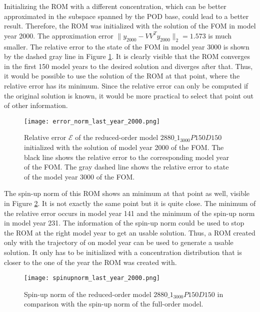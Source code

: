 Initializing the ROM with a different concentration, which can be better approximated in the subspace spanned by the POD base, could lead to a better result. Therefore, 
the ROM was initialized with the solution of the FOM in model year 2000. The approximation error $\parallel y_{2000} - VV^Ty_{2000} \parallel_2 = 1.573$ is much smaller.
The relative error to the state of the FOM in model year 3000 is shown by the dashed gray line in Figure \ref{fig:error_norm_last_year_2000}. It is clearly visible that the ROM converges in the first 150 model years to the desired solution and diverges after that. Thus, it would be possible to use the solution of the ROM at that point, where the relative error has its minimum. Since the relative error can only be computed if the original solution is known, it would be more practical to select that point out of other information. 
\begin{figure}[ht]
\centering
  \texttt{[image: error\_norm\_last\_year\_2000.png]}
  \caption[Relative error $\mathcal{E}$ of the reduced-order model $2880\_1_{3000}P150D150$ initialized with the solution of model year 2000 of the FOM.]{Relative error $\mathcal{E}$ of the reduced-order model $2880\_1_{3000}P150D150$
	    initialized with the solution of model year 2000 of the FOM. The black line shows the relative error to the corresponding model year of the FOM.
	    The gray dashed line shows the relative error to state of the model year 3000 of the FOM.}
  \label{fig:error_norm_last_year_2000}
\end{figure}
The spin-up norm of this ROM shows an minimum at that point as well, visible in Figure \ref{fig:spinupnorm_last_year_2000}. It is not exactly the same point but it is quite close. The minimum of the relative error occurs in model year 141 and the minimum of the spin-up norm in model year 231. The information of the spin-up norm could be used to stop the ROM at the right model year to get an usable solution. Thus, a ROM created only with the trajectory of on model year can be used to generate a usable solution. It only has to be initialized with a concentration distribution that is closer to the one of the year the ROM was created with.
\begin{figure}[H]
\centering
  \texttt{[image: spinupnorm\_last\_year\_2000.png]}
  \caption{Spin-up norm of the reduced-order model $2880\_1_{3000}P150D150$ in comparison with the spin-up norm of the full-order model.}
  \label{fig:spinupnorm_last_year_2000}
\end{figure}


